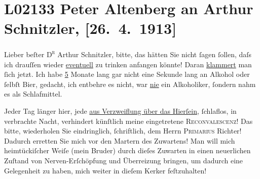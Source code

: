 

\section[Peter Altenberg an Arthur Schnitzler, {[}26. 4. 1913{]}]{L02133 Peter Altenberg an Arthur Schnitzler, {[}26. 4. 1913{]}}
\nopagebreak{}
\rehead{ }\normalsize\beginnumbering{}
\toendnotes[C]{\smallbreak\pagebreak[2]}
\toendnotes[C]{\smallbreak}
\pstart{}{\pb}Lieber beſter \textsc{D\textsuperscript{r}} Arthur Schnitzler,\pend\vspace{0.5em}
\pstart
           bitte, das hätten Sie nicht ſagen ſollen, daſs ich drauſſen wieder \uline{eventuell} zu trinken anfangen könnte! Daran \uline{klammert} man ſich jetzt. Ich habe \uline{5} Monate lang gar nicht eine Sekunde lang
               an Alkohol oder ſelbſt Bier, gedacht, ich entbehre es nicht, war \uline{nie} ein Alkoholiker, ſondern nahm es als Schlafmittel.\pend
           
\pstart
           Jeder Tag länger hier, jede \uline{aus Verzweiflung über das
                  Hierſein}, ſchlaflos, in 
               verbrachte Nacht, verhindert künſtlich meine eingetretene {\pb}\textsc{Reconvalescenz}! Das bitte, wiederholen Sie eindringlich,
               ſchriftlich, dem Herrn \textsc{Primarius}{ }Richter! Dadurch erretten Sie mich vor den
               Martern des Zuwartens! Man will mich heimtückiſcher Weiſe (mein Bruder) durch dieſes Zuwarten in einen
               neuerlichen Zuſtand von Nerven-Erſchöpfung und Überreizung bringen, um dadurch eine
                  {\pb}Gelegenheit zu haben, mich weiter in
               dieſem Kerker feſtzuhalten!\pend
           
